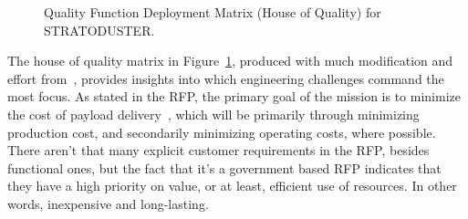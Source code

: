 \documentclass[12pt]{article}
\begin{document}
\begin{figure}[h!]
\caption{Quality Function Deployment Matrix (House of Quality) for STRATODUSTER.}
\label{fig:hq}
\end{figure}

The house of quality matrix in Figure~\ref{fig:hq}, produced with much modification and effort from~\cite{user121799:2019aa}, provides insights into which engineering challenges command the most focus.
As stated in the RFP, the primary goal of the mission is to minimize the cost of payload delivery~\cite{Bradley:2023aa}, which will be primarily through minimizing production cost, and secondarily minimizing operating costs, where possible.
There aren't that many explicit customer requirements in the RFP, besides functional ones, but the fact that it's a government based RFP indicates that they have a high priority on value, or at least, efficient use of resources.
In other words, inexpensive and long-lasting.
\end{document}
